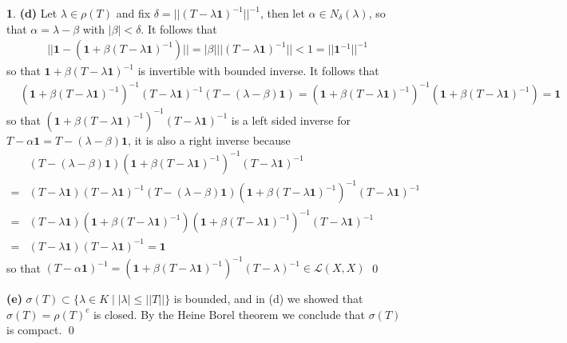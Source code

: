 \documentclass[11pt]{article}
\theoremstyle{definition}
\newtheorem{pb}{}
\newcommand{\set}[1]{\{#1\}}
\newcommand{\abs}[1]{\left\vert#1\right\vert}
\newcommand{\norm}[1]{\lvert\lvert#1\rvert\rvert}
\begin{document}
\begin{pb}
        \textbf{(d)} Let \(\lambda \in \rho(T)\) and fix \(\delta = \norm{(T - \lambda \mathbf{1})^{-1}}^{-1}\), then let \(\alpha \in N_\delta(\lambda)\), so that \(\alpha = \lambda - \beta\) with \(\abs{\beta} < \delta\). It follows that
        \begin{align*}
            \norm{\mathbf{1} - (\mathbf{1} + \beta(T - \lambda\mathbf{1})^{-1})} = \abs{\beta}\norm{(T - \lambda\mathbf{1})^{-1}} < 1 = \norm{\mathbf{1}^{-1}}^{-1}
        \end{align*}
        so that \(\mathbf{1} + \beta(T - \lambda\mathbf{1})^{-1}\) is invertible with bounded inverse. It follows that
        \begin{align*}
            &(\mathbf{1} + \beta(T - \lambda\mathbf{1})^{-1})^{-1}(T - \lambda \mathbf{1})^{-1}(T-(\lambda - \beta)\mathbf{1}) = (\mathbf{1} + \beta(T - \lambda\mathbf{1})^{-1})^{-1}(\mathbf{1} + \beta(T - \lambda \mathbf{1})^{-1}) = \mathbf{1}
        \end{align*}
        so that \((\mathbf{1} + \beta(T - \lambda\mathbf{1})^{-1})^{-1}(T - \lambda \mathbf{1})^{-1}\) is a left sided inverse for \(T - \alpha \mathbf{1} = T - (\lambda - \beta)\mathbf{1}\), it is also a right inverse because
        \begin{align*}
            &(T-(\lambda - \beta)\mathbf{1})(\mathbf{1} + \beta(T - \lambda\mathbf{1})^{-1})^{-1}(T - \lambda \mathbf{1})^{-1} \\
            = &(T - \lambda \mathbf{1})(T - \lambda \mathbf{1})^{-1}(T-(\lambda - \beta)\mathbf{1})(\mathbf{1} + \beta(T - \lambda\mathbf{1})^{-1})^{-1}(T - \lambda \mathbf{1})^{-1} \\
            = &(T - \lambda \mathbf{1})(\mathbf{1} + \beta(T - \lambda\mathbf{1})^{-1})(\mathbf{1} + \beta(T - \lambda\mathbf{1})^{-1})^{-1}(T-\lambda \mathbf{1})^{-1} \\
            = &(T - \lambda \mathbf{1})(T - \lambda \mathbf{1})^{-1} = \mathbf{1}
        \end{align*}
        so that \((T - \alpha \mathbf{1})^{-1} = (\mathbf{1} + \beta(T - \lambda\mathbf{1})^{-1})^{-1}(T - \lambda)^{-1} \in \mathcal{L}(X,X)\) \qed

        \textbf{(e)} \(\sigma(T) \subset \set{\lambda \in K \mid \abs{\lambda} \leq \norm{T}}\) is bounded, and in (d) we showed that \(\sigma(T) = \rho(T)^c\) is closed. By the Heine Borel theorem we conclude that \(\sigma(T)\) is compact. \qed
    \end{pb}
\end{document}
